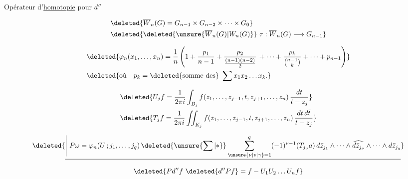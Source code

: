 Opérateur d'\uline{homotopie} pour $d''$

\[
\begin{aligned}
&\deleted{\overline W_n(G)=G_{n-1}\times G_{n-2}\times\cdots\times G_0}\\
&\deleted{\deleted{\unsure{\overline W_n(G)|W_n(G)}}\ \tau:\overline W_n(G)\longrightarrow G_{n-1}}
\end{aligned}
\]

\[
\begin{aligned}
&\deleted{\varphi_n(x_1,\ldots,x_n)=\frac1n\left(1+\frac{p_1}{n-1}
+\frac{p_2}{\frac{(n-1)(n-2)}2}\,+\cdots+
\frac{p_k}{\binom{n-1}{k}}+\cdots+p_{n-1}\right)}\\
&\deleted{\text{où}\quad p_k=\deleted{\text{somme des}}\ \sum x_1 x_2\ldots x_k.}
\end{aligned}
\]

\[
\begin{aligned}
&\deleted{U_j f=\frac{1}{2\pi i}\int_{B_j} f(z_1,\ldots,z_{j-1},t,z_{j+1},\ldots,z_n)\,\frac{dt}{t-z_j}}\\
&\deleted{T_j f=\frac{1}{2\pi i}\iint_{K_j} f(z_1,\ldots,z_{j-1},t,z_{j+1},\ldots,z_n)\,\frac{dt\,d\bar t}{t-z_j}}
\end{aligned}
\]


\[
\deleted{\underline{\left|\vphantom{\sum^q}\right. P\omega=\varphi_n(U\,;j_1,\ldots,j_q)\,\deleted{\unsure{\sum|\ast}}\sum_{\unsure{\nu|v|\gamma}=1}^{q}(-1)^{\nu-1}
(T_{j_\nu}a)\,d\bar z_{j_1}\wedge\cdots\wedge\widehat{d\bar z_{j_\nu}}\wedge\cdots\wedge d\bar z_{j_q}}}
\]

\[
\deleted{P d'' f\ \deleted{d''P f}=f-U_1 U_2\ldots U_n f}
\]
